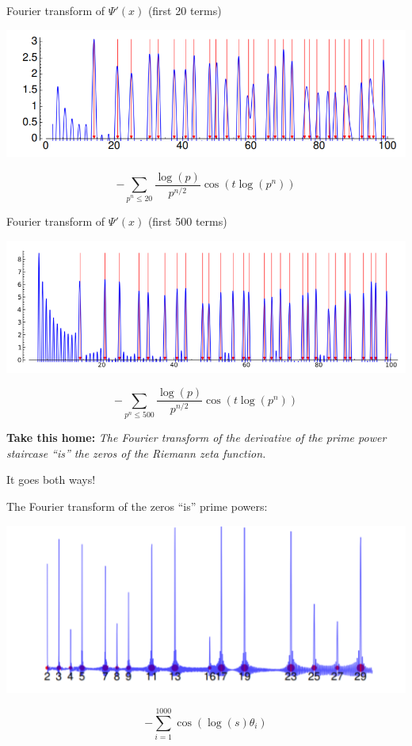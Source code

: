 \documentclass{beamer}
\begin{document}
\begin{frame}{Fourier transform of $\Psi'(x)$ (first 20 terms)}


\includegraphics[height=.41\textheight]{pics/prime-power-freq-20}

\vfill

$$
-\sum_{p^n\leq 20}{\frac{\log(p)}{p^{n/2}}}\cos(t\log(p^n))
$$

\end{frame}


\begin{frame}{Fourier transform of $\Psi'(x)$ (first 500 terms)}

\includegraphics[height=.43\textheight]{pics/prime-power-freq-500}
\vfill

$$
-\sum_{p^n\leq 500}{\frac{\log(p)}{p^{n/2}}}\cos(t\log(p^n))
$$

{\bf Take this home:}
{\em The Fourier transform of the derivative of the prime power staircase ``is'' the
zeros of the Riemann zeta function.}

\end{frame}


\begin{frame}{It goes both ways!}

The Fourier transform of the zeros ``is'' prime powers:

\begin{center}
\includegraphics[height=.55\textheight]{pics/zeros-series-1000}
\end{center}

$$-\sum_{i=1}^{1000}
   \cos(\log(s)\theta_i)$$


\end{frame}
\end{document}
